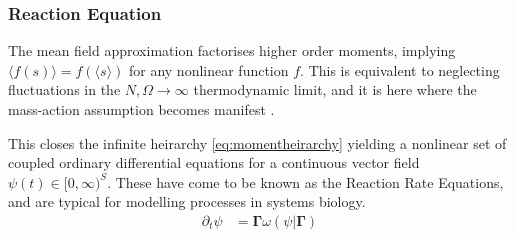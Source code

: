 \documentclass{article}[12pt]
\numberwithin{equation}{section}
\begin{document}
\subsubsection{Reaction Equation}\vspace{-10pt}
The mean field approximation factorises higher order moments, implying
$\big\langle f(s) \big\rangle=f(\langle s\rangle)$ for any nonlinear
function $f$. This is equivalent to neglecting fluctuations in the
$N,\Omega\rightarrow\infty$
thermodynamic limit, and it is here where the mass-action assumption
becomes manifest \cite{Gillespie2007}.

This closes the infinite heirarchy
\eqref{eq:momentheirarchy} yielding a nonlinear set of coupled ordinary
differential equations for a continuous vector field $\psi(t)\in[0,\infty)^S$.
These have come to be known as the Reaction Rate Equations, and are
typical for modelling processes in systems biology.
\begin{align}
	\partial_t
	\psi &=
	\mathbf{\Gamma}\omega(\psi|\mathbf{\Gamma})
	\label{eq:reaction}
\end{align}
\vspace{-40pt}
\end{document}
